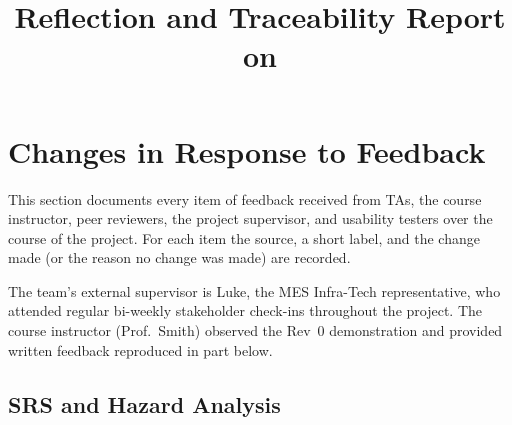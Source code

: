 \documentclass{article}
\title{Reflection and Traceability Report on \progname}
\author{\authname}
\date{}
\begin{document}
\maketitle

\tableofcontents

\newpage

\section{Changes in Response to Feedback}

This section documents every item of feedback received from TAs, the course
instructor, peer reviewers, the project supervisor, and usability testers
over the course of the project.  For each item the source, a short label,
and the change made (or the reason no change was made) are recorded.

The team's external supervisor is Luke, the MES Infra-Tech representative,
who attended regular bi-weekly stakeholder check-ins throughout the project.
The course instructor (Prof.\ Smith) observed the Rev~0 demonstration and
provided written feedback reproduced in part below.

\subsection{SRS and Hazard Analysis}
\end{document}
